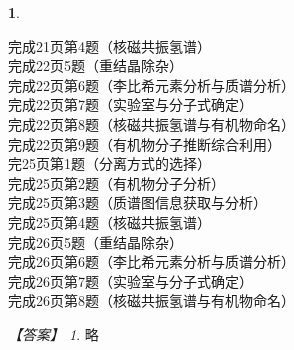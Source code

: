 \documentclass[UTF8, 10pt, a4paper, oneside]{ctexart}
\newcommand{\fs}[1]{{\fangsong #1}}%
\theoremstyle{definition}
\newtheorem{exercise}{}
\theoremstyle{remark}
\newtheorem*{answer}{【答案】}
\theoremstyle{plain}
\begin{document}
\begin{exercise}
    \begin{multicols}{2}
        \noindent 完成21页第4题（核磁共振氢谱）\\
        完成22页5题（重结晶除杂）\\
        完成22页第6题（李比希元素分析与质谱分析）\\
        完成22页第7题（实验室与分子式确定）\\
        完成22页第8题（核磁共振氢谱与有机物命名）\\
        完成22页第9题（有机物分子推断综合利用）\\
        完25页第1题（分离方式的选择）\\
        完成25页第2题（有机物分子分析）\\
        完成25页第3题（质谱图信息获取与分析）\\
        完成25页第4题（核磁共振氢谱）\\
        完成26页5题（重结晶除杂）\\
        完成26页第6题（李比希元素分析与质谱分析）\\
        完成26页第7题（实验室与分子式确定）\\
        完成26页第8题（核磁共振氢谱与有机物命名）
    \end{multicols}
    \begin{answer}
        \fs{略}
    \end{answer}
\end{exercise}
\end{document}
